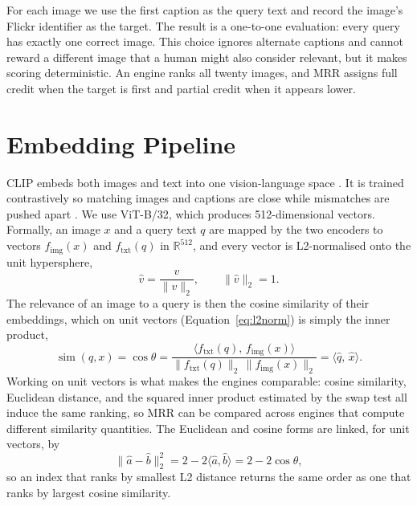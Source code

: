 For each image we use the first caption as the query text and record the image's
Flickr identifier as the target. The result is a one-to-one evaluation: every
query has exactly one correct image. This choice ignores alternate captions and
cannot reward a different image that a human might also consider relevant, but it
makes scoring deterministic. An engine ranks all twenty images, and MRR assigns
full credit when the target is first and partial credit when it appears lower.

\section{Embedding Pipeline}
\label{sec:method:embeddings}

CLIP embeds both images and text into one vision-language space
\cite{radford2021clip}. It is trained contrastively so matching images and
captions are close while mismatches are pushed apart \cite{radford2021clip}. We
use ViT-B/32, which produces 512-dimensional vectors. Formally, an image $x$ and
a query text $q$ are mapped by the two encoders to vectors $f_{\text{img}}(x)$ and
$f_{\text{txt}}(q)$ in $\mathbb{R}^{512}$, and every vector is L2-normalised onto
the unit hypersphere,
\begin{equation}
\hat{v} = \frac{v}{\lVert v \rVert_2},
\qquad \lVert \hat{v} \rVert_2 = 1 .
\label{eq:l2norm}
\end{equation}
The relevance of an image to a query is then the cosine similarity of their
embeddings, which on unit vectors (Equation~\ref{eq:l2norm}) is simply the inner
product,
\begin{equation}
\operatorname{sim}(q, x)
  = \cos\theta
  = \frac{\langle f_{\text{txt}}(q),\, f_{\text{img}}(x)\rangle}
         {\lVert f_{\text{txt}}(q)\rVert_2\,\lVert f_{\text{img}}(x)\rVert_2}
  = \langle \hat{q},\, \hat{x}\rangle .
\label{eq:cosine}
\end{equation}
Working on unit vectors is what makes the engines comparable: cosine similarity,
Euclidean distance, and the squared inner product estimated by the swap test all
induce the same ranking, so MRR can be compared across engines that compute
different similarity quantities. The Euclidean and cosine forms are linked, for
unit vectors, by
\begin{equation}
\lVert \hat{a} - \hat{b} \rVert_2^{2}
  = 2 - 2\langle \hat{a}, \hat{b}\rangle
  = 2 - 2\cos\theta ,
\label{eq:l2cosine}
\end{equation}
so an index that ranks by smallest L2 distance returns the same order as one that
ranks by largest cosine similarity.

